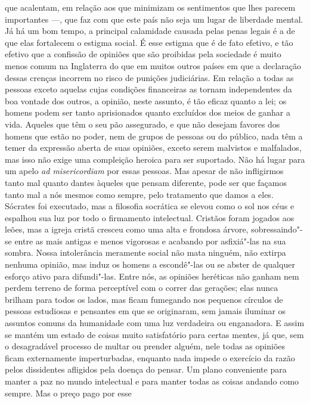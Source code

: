 que acalentam, em relação aos que minimizam os sentimentos que lhes
parecem importantes ---, que faz com que este país não seja um lugar de liberdade
mental. Já há um bom tempo, a principal calamidade causada pelas penas
legais é a de que elas fortalecem o estigma social. É esse estigma que
é de fato efetivo, e tão efetivo que a confissão de opiniões que são
proibidas pela sociedade é muito menos comum na Inglaterra do que em
muitos outros países em que a declaração dessas crenças incorrem no risco
de punições judiciárias. Em relação a todas as pessoas exceto
aquelas cujas condições financeiras as tornam independentes da boa
vontade dos outros, a opinião, neste assunto, é tão eficaz quanto a
lei; os homens podem ser tanto aprisionados quanto excluídos dos meios
de ganhar a vida. Aqueles que têm o seu pão assegurado, e que não
desejam favores dos homens que estão no poder, nem de grupos de pessoas
ou do público, nada têm a temer da expressão aberta de suas opiniões,
exceto serem malvistos e malfalados, mas isso não exige
uma compleição heroica para ser suportado. Não há lugar para um apelo
\textit{ad misericordiam} por essas pessoas. Mas apesar de não infligirmos
tanto mal quanto dantes àqueles que pensam diferente, pode ser que
façamos tanto mal a nós mesmos como sempre, pelo tratamento que damos a
eles. Sócrates foi executado, mas a filosofia socrática se elevou como
o sol nos céus e espalhou sua luz por todo o firmamento intelectual.
Cristãos foram jogados aos leões, mas a igreja cristã cresceu como uma
alta e frondosa árvore,  sobressaindo"-se entre as mais antigas e menos
vigorosas e acabando por asfixiá"-las na sua sombra. Nossa intolerância
meramente social não mata ninguém, não extirpa nenhuma opinião, mas
induz os homens a escondê"-las ou se abster de qualquer esforço
ativo para difundi"-las. Entre nós, as opiniões heréticas não ganham
nem perdem terreno de forma perceptível com o correr das gerações;
elas nunca brilham para todos os lados, mas ficam fumegando nos
pequenos círculos de pessoas estudiosas e pensantes em que se
originaram, sem jamais iluminar os assuntos comuns da humanidade com
uma luz verdadeira ou enganadora. E assim se mantém um estado de
coisas muito satisfatório para certas mentes, já que, sem o
desagradável processo de multar ou prender alguém, nele todas as
opiniões ficam externamente imperturbadas, enquanto nada impede o
exercício da razão pelos dissidentes afligidos pela doença do pensar.
Um plano conveniente para manter a paz no mundo intelectual e para
manter todas as coisas andando como sempre. Mas o preço pago por esse
